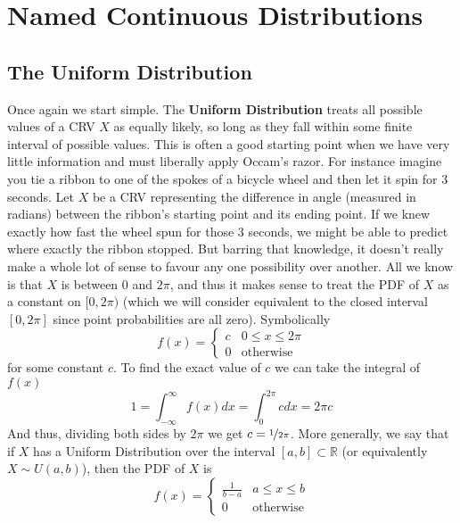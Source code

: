 \section{Named Continuous Distributions}
\subsection{The Uniform Distribution}
Once again we start simple. The \textbf{Uniform Distribution} treats all possible values of a CRV $X$ as equally likely, so long as they fall within some finite interval of possible values. This is often a good starting point when we have very little information and must liberally apply Occam's razor. For instance imagine you tie a ribbon to one of the spokes of a bicycle wheel and then let it spin for 3 seconds. Let $X$ be a CRV representing the difference in angle (measured in radians) between the ribbon's starting point and its ending point. If we knew exactly how fast the wheel spun for those 3 seconds, we might be able to predict where exactly the ribbon stopped. But barring that knowledge, it doesn't really make a whole lot of sense to favour any one possibility over another. All we know is that $X$ is between 0 and $2\pi$, and thus it makes sense to treat the PDF of $X$ as a constant on $[0,2\pi)$ (which we will consider equivalent to the closed interval $[0,2\pi]$ since point probabilities are all zero). Symbolically
\[
    f(x)=\begin{cases}
        c & 0\le x \le 2\pi
        \\
        0 & \text{otherwise}
    \end{cases}
\]
for some constant $c$. To find the exact value of $c$ we can take the integral of $f(x)$
\[
    1=\int_{-\infty}^\infty f(x)dx=\int_0^{2\pi} c dx=2\pi c
\]
And thus, dividing both sides by $2\pi$ we get $c=\nicefrac 1 {2\pi}$. More generally, we say that if $X$ has a Uniform Distribution over the interval $[a,b]\subset\mathbb R$ (or equivalently $X\sim U(a,b)$), then the PDF of $X$ is
\[
    f(x)=\begin{cases}
        \frac 1 {b-a} & a\le x \le b
        \\
        0 & \text{otherwise}
    \end{cases}
\]

